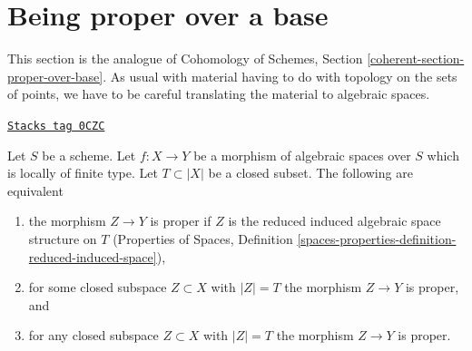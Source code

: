 \section{Being proper over a base}
\label{spaces-perfect-section-proper-over-base}
This section is the analogue of Cohomology of Schemes, Section
\ref{coherent-section-proper-over-base}.
As usual with material having to do with topology on the sets of points,
we have to be careful translating the material to algebraic spaces.

\begin{lemma}
\label{spaces-perfect-lemma-closed-proper-over-base}
\href{https://stacks.math.columbia.edu/tag/0CZC}{\texttt{Stacks tag 0CZC}}

Let $S$ be a scheme. Let $f : X \to Y$ be a morphism of algebraic spaces
over $S$ which is locally of finite type. Let $T \subset |X|$ be a closed
subset. The following are equivalent
\begin{enumerate}
\item the morphism $Z \to Y$ is proper if $Z$ is the reduced
induced algebraic space structure on $T$
(Properties of Spaces, Definition
\ref{spaces-properties-definition-reduced-induced-space}),
\item for some closed subspace $Z \subset X$ with $|Z| = T$
the morphism $Z \to Y$ is proper, and
\item for any closed subspace $Z \subset X$ with $|Z| = T$ the morphism
$Z \to Y$ is proper.
\end{enumerate}
\end{lemma}

